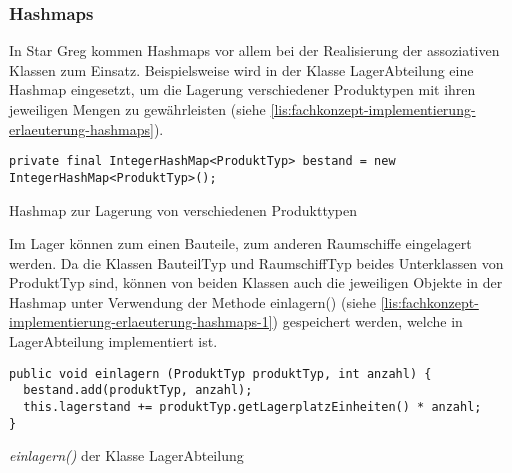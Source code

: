 \subsubsection{Hashmaps}
\label{subsub:fachkonzept-implementierung-erlaeuterung-hashmaps}

In Star Greg kommen Hashmaps vor allem bei der Realisierung der assoziativen Klassen zum Einsatz. Beispielsweise wird in der Klasse LagerAbteilung eine Hashmap eingesetzt, um die Lagerung verschiedener Produktypen mit ihren jeweiligen Mengen zu gewährleisten (siehe \ref{lis:fachkonzept-implementierung-erlaeuterung-hashmaps}).

\begin{programm}[htb]
\begin{lstlisting}[breaklines=true]
private final IntegerHashMap<ProduktTyp> bestand = new IntegerHashMap<ProduktTyp>();
\end{lstlisting}
\caption{Hashmap zur Lagerung von verschiedenen Produkttypen}
\label{lis:fachkonzept-implementierung-erlaeuterung-hashmaps}
\end{programm}

Im Lager können zum einen Bauteile, zum anderen Raumschiffe eingelagert werden. Da die Klassen BauteilTyp und RaumschiffTyp beides Unterklassen von ProduktTyp sind, können von beiden Klassen auch die jeweiligen Objekte in der Hashmap unter Verwendung der Methode einlagern() (siehe \ref{lis:fachkonzept-implementierung-erlaeuterung-hashmaps-1}) gespeichert werden, welche in LagerAbteilung implementiert ist.

\begin{programm}[htb]
\begin{lstlisting}[breaklines=true]
public void einlagern (ProduktTyp produktTyp, int anzahl) {
  bestand.add(produktTyp, anzahl);
  this.lagerstand += produktTyp.getLagerplatzEinheiten() * anzahl;
}
\end{lstlisting}
\caption{\textit{einlagern()} der Klasse LagerAbteilung}
\label{lis:fachkonzept-implementierung-erlaeuterung-hashmaps-1}
\end{programm}